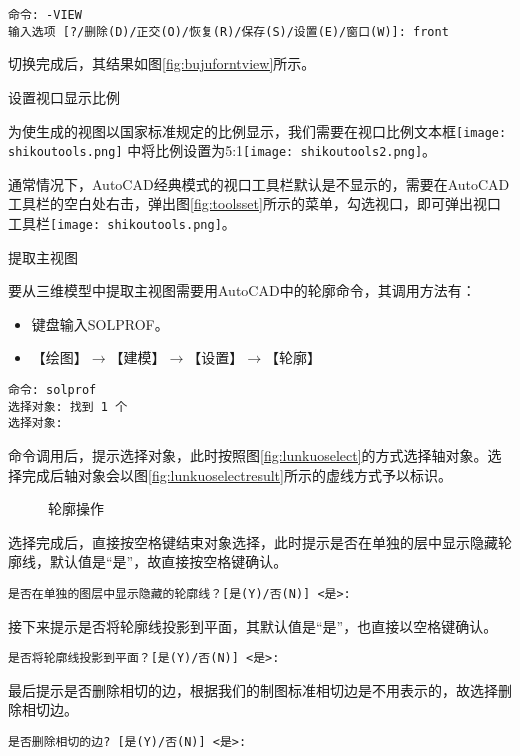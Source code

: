 \begin{procedure}
\begin{lstlisting}
命令: -VIEW
输入选项 [?/删除(D)/正交(O)/恢复(R)/保存(S)/设置(E)/窗口(W)]: front
\end{lstlisting}

切换完成后，其结果如图\ref{fig:bujuforntview}所示。
\item 设置视口显示比例

为使生成的视图以国家标准规定的比例显示，我们需要在视口比例文本框\texttt{[image: shikoutools.png]}  中将比例设置为5:1\texttt{[image: shikoutools2.png]}。

通常情况下，AutoCAD经典模式的视口工具栏默认是不显示的，需要在AutoCAD工具栏的空白处右击，弹出图\ref{fig:toolsset}所示的菜单，勾选视口，即可弹出视口工具栏\texttt{[image: shikoutools.png]}。
\item 提取主视图

要从三维模型中提取主视图需要用AutoCAD中的轮廓命令，其调用方法有：
\begin{itemize}
\item 键盘输入SOLPROF。
\item 【绘图】$\rightarrow$【建模】$\rightarrow$【设置】$\rightarrow$【轮廓】
\end{itemize}
\begin{lstlisting}
命令: solprof
选择对象: 找到 1 个
选择对象:
\end{lstlisting}

命令调用后，提示选择对象，此时按照图\ref{fig:lunkuoselect}的方式选择轴对象。选择完成后轴对象会以图\ref{fig:lunkuoselectresult}所示的虚线方式予以标识。
\begin{figure}[htbp]
\centering
{}
\hspace{20pt}
\caption{轮廓操作}
\end{figure}

选择完成后，直接按空格键结束对象选择，此时提示是否在单独的层中显示隐藏轮廓线，默认值是“是”，故直接按空格键确认。
\begin{lstlisting}
是否在单独的图层中显示隐藏的轮廓线？[是(Y)/否(N)] <是>:
\end{lstlisting}

接下来提示是否将轮廓线投影到平面，其默认值是“是”，也直接以空格键确认。
\begin{lstlisting}
是否将轮廓线投影到平面？[是(Y)/否(N)] <是>:
\end{lstlisting}

最后提示是否删除相切的边，根据我们的制图标准相切边是不用表示的，故选择删除相切边。
\begin{lstlisting}
是否删除相切的边? [是(Y)/否(N)] <是>:
\end{lstlisting}


\end{procedure}
